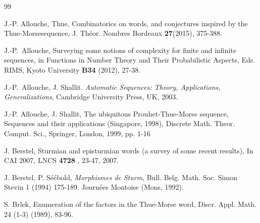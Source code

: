 \documentclass[a4 paper,12pt]{article}
\begin{document}

\begin{thebibliography}{99}

  J.-P.  Allouche, Thue,  Combinatorics  on  words,  and  conjectures  inspired  by  the  Thue-Morsesequence, J. Th\'eor. Nombres Bordeaux \textbf{27}(2015), 375-388.


 J.-P.~Allouche, Surveying some notions of complexity for finite and infinite sequences, in Functions in Number Theory and Their Probabilistic Aspects, Eds. RIMS, Kyoto University {\bf B34} (2012), 27-38.

 J.-P.~Allouche, J. Shallit. \emph{Automatic Sequences: Theory, Applications, Generalizations}, Cambridge University Press, UK, 2003.

 J.-P. Allouche, J. Shallit, The ubiquitous Prouhet-Thue-Morse sequence, Sequences and their applications (Singapore, 1998), Discrete Math. Theor.
Comput. Sci., Springer, London, 1999, pp. 1-16

 J. Berstel, Sturmian and episturmian words (a survey of some recent results), In CAI 2007, LNCS {\bf 4728} , 23-47, 2007.


 J. Berstel, P. S\'e\'ebold, \emph{Morphismes de Sturm}, Bull. Belg. Math. Soc. Simon Stevin 1 (1994) 175-189. Journ\'ees Montoise (Mons, 1992).

 S. Brlek, Enumeration of the factors in the Thue-Morse word, Discr. Appl. Math. 24 (1-3) (1989), 83-96.





\end{thebibliography}
\end{document}
